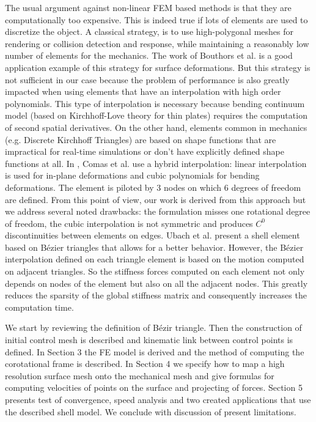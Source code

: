 \documentclass{egpubl}
\begin{document}
The usual argument against non-linear FEM based methods is that they are computationally too expensive. 
This is indeed true if lots of elements are used to discretize the object.
A classical strategy, is to use high-polygonal meshes for rendering or collision detection and response, while maintaining a reasonably low number of elements for the mechanics.
The work of Bouthors et al.\cite{Bouthors2007} is a good application example of this strategy for surface deformations.
But this strategy is not sufficient in our case because the problem of performance is also greatly impacted when using elements that have an interpolation with high order polynomials.
This type of interpolation is necessary because bending continuum model
(based on Kirchhoff-Love theory for thin plates)  requires the computation of second spatial derivatives.
On the other hand, elements common in mechanics (e.g. Discrete Kirchhoff Triangles) are based on shape functions that are impractical for real-time simulations or don't have explicitly defined shape functions at all.
In \cite{Comas2010c}, Comas et al. use a hybrid interpolation: linear interpolation is used for in-plane deformations and cubic polynomials for bending deformations.
The element is piloted by 3 nodes on which 6 degrees of freedom are defined. 
From this point of view, our work is derived from this approach but we address several noted drawbacks: the formulation misses one rotational degree of freedom, the cubic interpolation is not symmetric and produces $C^0$  discontinuities between elements on edges.
Ubach et al. \cite{Ubach2010}  present a shell element based on B\'ezier triangles that allows for a better behavior.
However, the B\'ezier interpolation defined on each triangle element is based on the motion computed on adjacent triangles.
So the stiffness forces computed on each element not only depends on nodes of the element but also on all the adjacent nodes. 
This greatly reduces the sparsity of the global stiffness matrix and consequently increases the computation time.


We start by reviewing the definition of B\'ezir triangle. Then the construction
of initial control mesh is described and  kinematic link between control points
is defined. In Section 3 the FE model is derived and the method of computing
the corotational frame is described. In Section 4 we specify how to map a high
resolution surface mesh onto the mechanical mesh and give formulas for
computing velocities of points on the surface and projecting of forces. Section
5 presents test of convergence, speed analysis and two created applications
that use the described shell model. We conclude with discussion of present
limitations.
\end{document}
